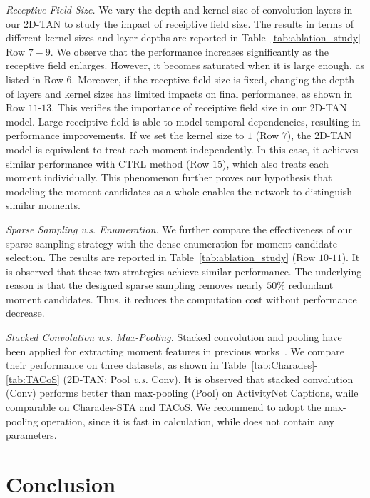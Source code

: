 \documentclass[letterpaper]{article} %
\begin{document}
\textit{Receptive Field Size. } We vary the depth and kernel size of convolution layers in our 2D-TAN to study the impact of receiptive field size.
The results in terms of different kernel sizes and layer depths are reported in Table~\ref{tab:ablation_study} Row $7-9$.
We observe that the performance increases significantly as the receptive field enlarges.
However, it becomes saturated when it is large enough, as listed in Row $6$.
Moreover, if the receptive field size is fixed, changing the depth of layers and kernel sizes has limited impacts on final performance, as shown in Row $11$-$13$.
This verifies the importance of receiptive field size in our 2D-TAN model. Large receiptive field is able to model temporal dependencies, resulting in performance improvements.
If we set the kernel size to $1$ (Row $7$), the 2D-TAN model is equivalent to treat each moment independently. In this case, it achieves similar performance with CTRL method (Row $15$), which also treats each moment individually.
This phenomenon further proves our hypothesis that modeling the moment candidates as a whole enables the network to distinguish similar moments.

\textit{Sparse Sampling \emph{v.s.} Enumeration.}
We further compare the effectiveness of our sparse sampling strategy with the dense enumeration for moment candidate selection. The results are reported in Table~\ref{tab:ablation_study} (Row $10$-$11$). It is observed that these two strategies achieve similar performance. The underlying reason is that the designed sparse sampling removes nearly $50\%$ redundant moment candidates. Thus, it reduces the computation cost without performance decrease.

\textit{Stacked Convolution \emph{v.s.} Max-Pooling.}
Stacked convolution and pooling have been applied for extracting moment features in previous works~\cite{hendricks17iccv,zhang2019man}.
We compare their performance on three datasets, as  shown in Table~\ref{tab:Charades}-\ref{tab:TACoS} (2D-TAN: Pool \emph{v.s.} Conv).
It is observed that stacked convolution (Conv) performs better than max-pooling (Pool) on ActivityNet Captions, while comparable on Charades-STA and TACoS. We recommend to adopt the max-pooling operation, since it is fast in calculation, while does not contain any parameters.

\vspace{-3.23mm}
\section{Conclusion}
\end{document}
